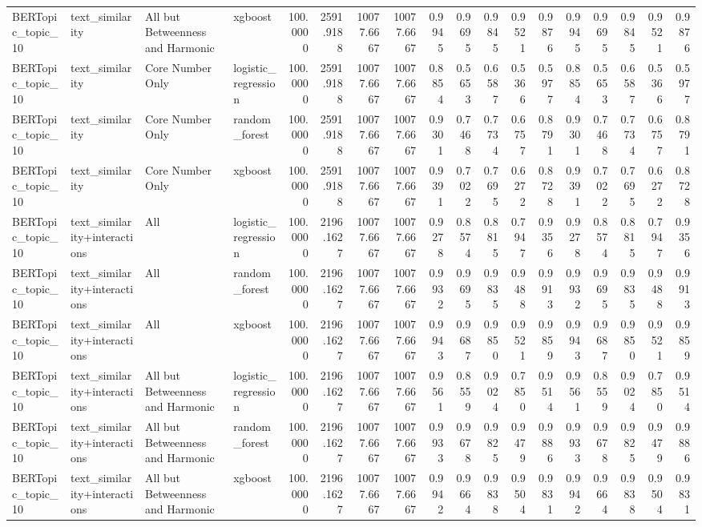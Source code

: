 \begin{tabular}{llllrrrrrrrrrrrrrr}
BERTopic_topic_10 & text_similarity & All but Betweenness and Harmonic & xgboost & 100.0000 & 2591.9188 & 10077.6667 & 10077.6667 & 0.9945 & 0.9695 & 0.9845 & 0.9521 & 0.9876 & 0.9945 & 0.9695 & 0.9845 & 0.9521 & 0.9876 \\
BERTopic_topic_10 & text_similarity & Core Number Only & logistic_regression & 100.0000 & 2591.9188 & 10077.6667 & 10077.6667 & 0.8854 & 0.5653 & 0.6587 & 0.5366 & 0.5977 & 0.8854 & 0.5653 & 0.6587 & 0.5366 & 0.5977 \\
BERTopic_topic_10 & text_similarity & Core Number Only & random_forest & 100.0000 & 2591.9188 & 10077.6667 & 10077.6667 & 0.9301 & 0.7468 & 0.7734 & 0.6757 & 0.8791 & 0.9301 & 0.7468 & 0.7734 & 0.6757 & 0.8791 \\
BERTopic_topic_10 & text_similarity & Core Number Only & xgboost & 100.0000 & 2591.9188 & 10077.6667 & 10077.6667 & 0.9391 & 0.7022 & 0.7695 & 0.6272 & 0.8728 & 0.9391 & 0.7022 & 0.7695 & 0.6272 & 0.8728 \\
BERTopic_topic_10 & text_similarity+interactions & All & logistic_regression & 100.0000 & 2196.1627 & 10077.6667 & 10077.6667 & 0.9278 & 0.8574 & 0.8815 & 0.7947 & 0.9356 & 0.9278 & 0.8574 & 0.8815 & 0.7947 & 0.9356 \\
BERTopic_topic_10 & text_similarity+interactions & All & random_forest & 100.0000 & 2196.1627 & 10077.6667 & 10077.6667 & 0.9932 & 0.9695 & 0.9835 & 0.9488 & 0.9913 & 0.9932 & 0.9695 & 0.9835 & 0.9488 & 0.9913 \\
BERTopic_topic_10 & text_similarity+interactions & All & xgboost & 100.0000 & 2196.1627 & 10077.6667 & 10077.6667 & 0.9943 & 0.9687 & 0.9850 & 0.9521 & 0.9859 & 0.9943 & 0.9687 & 0.9850 & 0.9521 & 0.9859 \\
BERTopic_topic_10 & text_similarity+interactions & All but Betweenness and Harmonic & logistic_regression & 100.0000 & 2196.1627 & 10077.6667 & 10077.6667 & 0.9561 & 0.8559 & 0.9024 & 0.7850 & 0.9514 & 0.9561 & 0.8559 & 0.9024 & 0.7850 & 0.9514 \\
BERTopic_topic_10 & text_similarity+interactions & All but Betweenness and Harmonic & random_forest & 100.0000 & 2196.1627 & 10077.6667 & 10077.6667 & 0.9933 & 0.9678 & 0.9825 & 0.9479 & 0.9886 & 0.9933 & 0.9678 & 0.9825 & 0.9479 & 0.9886 \\
BERTopic_topic_10 & text_similarity+interactions & All but Betweenness and Harmonic & xgboost & 100.0000 & 2196.1627 & 10077.6667 & 10077.6667 & 0.9942 & 0.9664 & 0.9838 & 0.9504 & 0.9831 & 0.9942 & 0.9664 & 0.9838 & 0.9504 & 0.9831 \\

\end{tabular}
